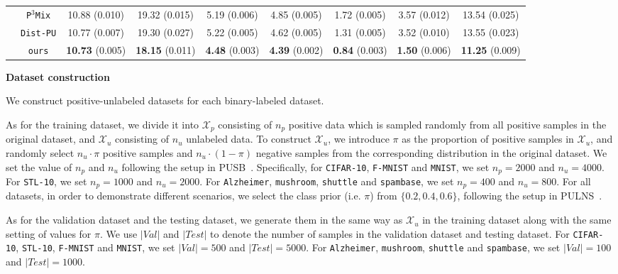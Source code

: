 \documentclass[sigconf]{acmart}
\begin{document}
\begin{table*}[htbp]
\begin{tabular}{ccccccccc}
        & \texttt{P$^3$Mix} & 10.88 (0.010) & 19.32 (0.015) & 5.19 (0.006) & 4.85 (0.005) & 1.72 (0.005) & 3.57 (0.012) & 13.54 (0.025)\\
        & \texttt{Dist-PU} & 10.77 (0.007) & 19.30 (0.027) & 5.22 (0.005) & 4.62 (0.005) & 1.31 (0.005) & 3.52 (0.010) & 13.55 (0.023)\\
        & \texttt{ours} & \textbf{10.73} (0.005) & \textbf{18.15} (0.011) & \textbf{4.48} (0.003) & \textbf{4.39} (0.002) & \textbf{0.84} (0.003) & \textbf{1.50} (0.006) & \textbf{11.25} (0.009)\\
        \bottomrule
    \end{tabular}

\end{table*}




\noindent\textbf{Dataset construction}

We construct positive-unlabeled datasets for each binary-labeled dataset. 

As for the training dataset, we divide it into $\mathcal{X}_p$ consisting of $n_p$ positive data which is sampled randomly from all positive samples in the original dataset, and $\mathcal{X}_u$ consisting of $n_u$ unlabeled data. To construct $\mathcal{X}_u$, we introduce $\pi$ as the proportion of positive samples in $\mathcal{X}_u$, and randomly select $n_u\cdot \pi$ positive samples and $n_u\cdot (1-\pi)$ negative samples from the corresponding distribution in the original dataset. We set the value of $n_p$ and $n_u$ following the setup in PUSB~\cite{kato2018learning}. Specifically, for \texttt{CIFAR-10}, \texttt{F-MNIST} and \texttt{MNIST}, we set $n_p=2000$ and $n_u=4000$. For \texttt{STL-10}, we set $n_p=1000$ and $n_u=2000$. For \texttt{Alzheimer}, \texttt{mushroom}, \texttt{shuttle} and \texttt{spambase}, we set $n_p=400$ and $n_u=800$. For all datasets, in order to demonstrate different scenarios, we select the class prior (i.e. $\pi$) from $\{0.2, 0.4, 0.6\}$, following the setup in PULNS~\cite{luo2021pulns}.

As for the validation dataset and the testing dataset, we generate them in the same way as $\mathcal{X}_u$ in the training dataset along with the same setting of values for $\pi$. We use $|Val|$ and $|Test|$ to denote the number of samples in the validation dataset and testing dataset. For \texttt{CIFAR-10}, \texttt{STL-10}, \texttt{F-MNIST} and \texttt{MNIST}, we set $|Val|=500$ and $|Test|=5000$. For \texttt{Alzheimer}, \texttt{mushroom}, \texttt{shuttle} and \texttt{spambase}, we set $|Val|=100$ and $|Test|=1000$.
\end{document}
